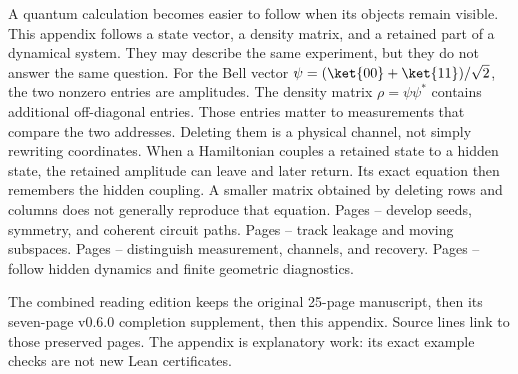 A quantum calculation becomes easier to follow when its objects remain visible. This appendix follows a state vector, a density matrix, and a retained part of a dynamical system. They may describe the same experiment, but they do not answer the same question.
For the Bell vector $\psi=(\ket{00}+\ket{11})/\sqrt2$, the two nonzero entries are amplitudes. The density matrix $\rho=\psi\psi^*$ contains additional off-diagonal entries. Those entries matter to measurements that compare the two addresses. Deleting them is a physical channel, not simply rewriting coordinates.
When a Hamiltonian couples a retained state to a hidden state, the retained amplitude can leave and later return. Its exact equation then remembers the hidden coupling. A smaller matrix obtained by deleting rows and columns does not generally reproduce that equation.
Pages -- develop seeds, symmetry, and coherent circuit paths. Pages -- track leakage and moving subspaces. Pages -- distinguish measurement, channels, and recovery. Pages -- follow hidden dynamics and finite geometric diagnostics.

The combined reading edition keeps the original 25-page manuscript, then its seven-page v0.6.0 completion supplement, then this appendix. Source lines link to those preserved pages. The appendix is explanatory work: its exact example checks are not new Lean certificates.

